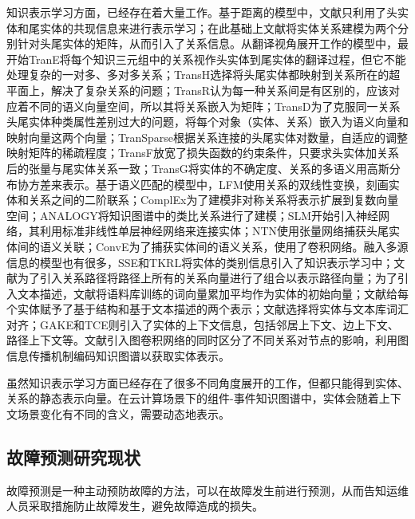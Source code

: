 知识表示学习方面，已经存在着大量工作。基于距离的模型中，文献\parencite{bordes2012joint}只利用了头实体和尾实体的共现信息来进行表示学习；在此基础上文献\parencite{bordes2011learning}将实体关系建模为两个分别针对头尾实体的矩阵，从而引入了关系信息。从翻译视角展开工作的模型中，最开始TranE\cite{bordes2013translatingE}将每个知识三元组中的关系视作头实体到尾实体的翻译过程，但它不能处理复杂的一对多、多对多关系；TransH\cite{wang2014knowledge}选择将头尾实体都映射到关系所在的超平面上，解决了复杂关系的问题；TransR\cite{lin2015learning}认为每一种关系间是有区别的，应该对应着不同的语义向量空间，所以其将关系嵌入为矩阵；TransD\cite{ji2015knowledge}为了克服同一关系头尾实体种类属性差别过大的问题，将每个对象（实体、关系）嵌入为语义向量和映射向量这两个向量；TranSparse\cite{ji2016knowledge}根据关系连接的头尾实体对数量，自适应的调整映射矩阵的稀疏程度；TransF\cite{feng2016knowledge}放宽了损失函数的约束条件，只要求头实体加关系后的张量与尾实体关系一致；TransG\cite{ou2016asymmetric}将实体的不确定度、关系的多语义用高斯分布协方差来表示。基于语义匹配的模型中，LFM\cite{jenatton2012latent}使用关系的双线性变换，刻画实体和关系之间的二阶联系；ComplEx\cite{trouillon2016complex}为了建模非对称关系将表示扩展到复数向量空间；ANALOGY\cite{liu2017analogical}将知识图谱中的类比关系进行了建模；SLM\cite{socher2013reasoning}开始引入神经网络，其利用标准非线性单层神经网络来连接实体；NTN\cite{socher2013reasoning}使用张量网络捕获头尾实体间的语义关联；ConvE\cite{dettmers2018convolutional}为了捕获实体间的语义关系，使用了卷积网络。融入多源信息的模型也有很多，SSE\cite{guo2015semantically}和TKRL\cite{xie2016representation}将实体的类别信息引入了知识表示学习中；文献\parencite{lin2015modeling}为了引入关系路径将路径上所有的关系向量进行了组合以表示路径向量；为了引入文本描述，文献\parencite{socher2013reasoning}将语料库训练的词向量累加平均作为实体的初始向量；文献\parencite{xie2016representation}给每个实体赋予了基于结构和基于文本描述的两个表示；文献\parencite{wang2016text}选择将实体与文本库词汇对齐；GAKE\cite{feng2016gake}和TCE\cite{shi2017knowledge}则引入了实体的上下文信息，包括邻居上下文、边上下文、路径上下文等。文献\parencite{schlichtkrull2018modeling}引入图卷积网络的同时区分了不同关系对节点的影响，利用图信息传播机制编码知识图谱以获取实体表示。

虽然知识表示学习方面已经存在了很多不同角度展开的工作，但都只能得到实体、关系的静态表示向量。在云计算场景下的组件-事件知识图谱中，实体会随着上下文场景变化有不同的含义，需要动态地表示。

\subsection{故障预测研究现状}
故障预测是一种主动预防故障的方法，可以在故障发生前进行预测，从而告知运维人员采取措施防止故障发生，避免故障造成的损失。

